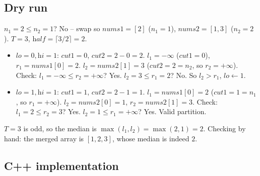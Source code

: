 \subsection*{Dry run}


$n_1=2 \le n_2=1$? No -- swap so $\textit{nums1}=[2]$ ($n_1=1$),
$\textit{nums2}=[1,3]$ ($n_2=2$). $T=3$, $\textit{half}=\lceil 3/2
\rceil=2$.

\begin{itemize}
  \item $\textit{lo}=0,\textit{hi}=1$: $\textit{cut1}=0$,
        $\textit{cut2}=2-0=2$. $l_1=-\infty$ ($\textit{cut1}=0$),
        $r_1=\textit{nums1}[0]=2$. $l_2=\textit{nums2}[1]=3$
        ($\textit{cut2}=2=n_2$, so $r_2=+\infty$). Check: $l_1=-\infty \le
        r_2=+\infty$? Yes. $l_2=3 \le r_1=2$? No. So $l_2 > r_1$,
        $\textit{lo} \gets 1$.
  \item $\textit{lo}=1,\textit{hi}=1$: $\textit{cut1}=1$,
        $\textit{cut2}=2-1=1$. $l_1=\textit{nums1}[0]=2$
        ($\textit{cut1}=1=n_1$, so $r_1=+\infty$). $l_2=\textit{nums2}[0]=1$,
        $r_2=\textit{nums2}[1]=3$. Check: $l_1=2 \le r_2=3$? Yes.
        $l_2=1 \le r_1=+\infty$? Yes. Valid partition.
\end{itemize}

$T=3$ is odd, so the median is $\max(l_1,l_2) = \max(2,1) = 2$. Checking
by hand: the merged array is $[1,2,3]$, whose median is indeed $2$.

\subsection*{C++ implementation}

